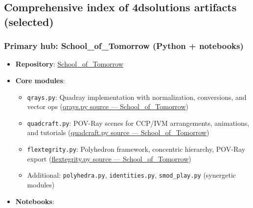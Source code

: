 \documentclass[
  10pt,
]{article}
\providecommand{\tightlist}{%
  \setlength{\itemsep}{0pt}\setlength{\parskip}{0pt}}
\begin{document}
\hypertarget{comprehensive-index-of-4dsolutions-artifacts-selected}{%
\subsection{Comprehensive index of 4dsolutions artifacts
(selected)}\label{comprehensive-index-of-4dsolutions-artifacts-selected}}

\hypertarget{primary-hub-school_of_tomorrow-python-notebooks}{%
\subsubsection{Primary hub: School\_of\_Tomorrow (Python +
notebooks)}\label{primary-hub-school_of_tomorrow-python-notebooks}}

\begin{itemize}
\tightlist
\item
  \textbf{Repository}:
  \href{https://github.com/4dsolutions/School_of_Tomorrow}{School\_of\_Tomorrow}
\item
  \textbf{Core modules}:

  \begin{itemize}
  \tightlist
  \item
    \texttt{qrays.py}: Quadray implementation with normalization,
    conversions, and vector ops
    (\href{https://github.com/4dsolutions/School_of_Tomorrow/blob/master/qrays.py}{qrays.py
    source --- School\_of\_Tomorrow})
  \item
    \texttt{quadcraft.py}: POV-Ray scenes for CCP/IVM arrangements,
    animations, and tutorials
    (\href{https://github.com/4dsolutions/School_of_Tomorrow/blob/master/quadcraft.py}{quadcraft.py
    source --- School\_of\_Tomorrow})
  \item
    \texttt{flextegrity.py}: Polyhedron framework, concentric hierarchy,
    POV-Ray export
    (\href{https://github.com/4dsolutions/School_of_Tomorrow/blob/master/flextegrity.py}{flextegrity.py
    source --- School\_of\_Tomorrow})
  \item
    Additional: \texttt{polyhedra.py}, \texttt{identities.py},
    \texttt{smod\_play.py} (synergetic modules)
  \end{itemize}
\item
  \textbf{Notebooks}:


\end{itemize}
\end{document}
